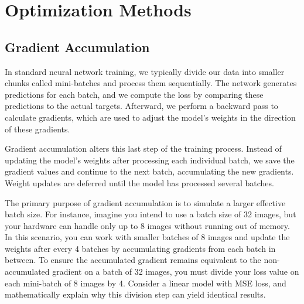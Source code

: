 \section{Optimization Methods}
\label{sec:method}

\subsection{Gradient Accumulation}

In standard neural network training, we typically divide our data into smaller chunks called mini-batches and process them sequentially. The network generates predictions for each batch, and we compute the loss by comparing these predictions to the actual targets. Afterward, we perform a backward pass to calculate gradients, which are used to adjust the model's weights in the direction of these gradients.

Gradient accumulation alters this last step of the training process. Instead of updating the model's weights after processing each individual batch, we save the gradient values and continue to the next batch, accumulating the new gradients. Weight updates are deferred until the model has processed several batches.

The primary purpose of gradient accumulation is to simulate a larger effective batch size. For instance, imagine you intend to use a batch size of 32 images, but your hardware can handle only up to 8 images without running out of memory. In this scenario, you can work with smaller batches of 8 images and update the weights after every 4 batches by accumulating gradients from each batch in between. To ensure the accumulated gradient remains equivalent to the non-accumulated gradient on a batch of 32 images, you must divide your loss value on each mini-batch of 8 images by 4. Consider a linear model with MSE loss, and mathematically explain why this division step can yield identical results.

